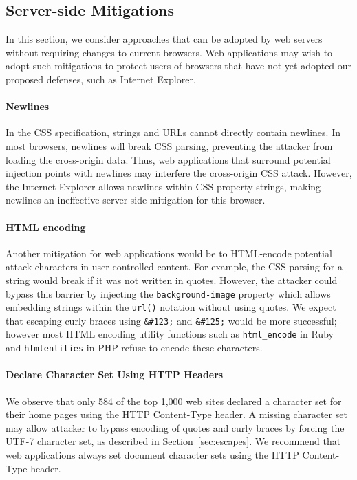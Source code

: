 \documentclass{acm_proc_article-sp}
\begin{document}
\subsection{Server-side Mitigations}
In this section, we consider approaches that can be adopted by web servers
without requiring changes to current browsers. Web applications may wish to
adopt such mitigations to protect users of browsers that have not yet adopted
our proposed defenses, such as Internet Explorer.

\paragraph{Newlines}
In the CSS specification, strings and URLs cannot directly contain newlines.
In most browsers, newlines will break CSS parsing, preventing the attacker from loading the cross-origin data.
Thus, web applications that surround potential injection points with
newlines may interfere the cross-origin CSS attack.
However, the Internet Explorer allows newlines within CSS
property strings, making newlines an ineffective server-side mitigation for this browser.

\paragraph{HTML encoding}
Another mitigation for web applications would be to HTML-encode potential attack characters in user-controlled content. For example, the CSS parsing for a string would break if it was not written in quotes. However, the attacker could bypass this barrier by injecting the \texttt{background-image} property which allows embedding strings within the \texttt{url()} notation without using quotes. We expect that escaping curly braces using \verb|&#123;| and \verb|&#125;| would be more successful; however most HTML encoding utility functions such as \verb|html_encode| in Ruby and \verb|htmlentities| in PHP refuse to encode these characters.

\paragraph{Declare Character Set Using HTTP Headers}
We observe that only 584 of the top 1,000 web sites declared a character set
for their home pages using the HTTP Content-Type header. A missing character set
may allow attacker to bypass encoding of quotes and curly braces by forcing
the UTF-7 character set, as described in Section~\ref{sec:escapes}. We
recommend that web applications always set document character sets using the HTTP Content-Type header.
\end{document}
